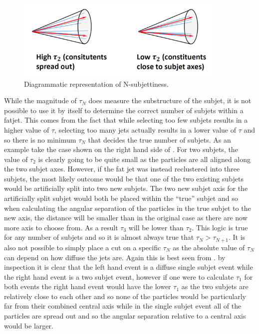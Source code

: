 \begin{figure}
  \centering
  \includegraphics[width=0.9\textwidth]{TopAnalysis/figures/nsubjettiness.png}
  \caption[Diagrammatic representation of N-subjettiness]{Diagrammatic representation of N-subjettiness.}
  \label{fig:nsubjet}
\end{figure}

While the magnitude of $\tau_N$ does measure the substructure of the subjet, it is not possible to use it by itself to determine the correct number of subjets within a fatjet. This comes from the fact that while selecting too few subjets results in a higher value of $\tau$, selecting too many jets actually results in a lower value of $\tau$ and so there is no minimum $\tau_N$ that decides the true number of subjets. As an example take the case shown on the right hand side of . For two subjets, the value of $\tau_2$ is clearly going to be quite small as the particles are all aligned along the two subjet axes. However, if the fat jet was instead reclustered into three subjets, the most likely outcome would be that one of the two existing subjets would be artificially split into two new subjets. The two new subjet axis for the artificially split subjet would both be placed within the ``true'' subjet and so when calculating the angular separation of the particles in the true subjet to the new axis, the distance will be smaller than in the original case as there are now more axis to choose from. As a result $\tau_3$ will be lower than $\tau_2$. This logic is true for any number of subjets and so it is almost always true that $\tau_N > \tau_{N+1}$. It is also not possible to simply place a cut on a specific $\tau_N$ as the absolute value of $\tau_N$ can depend on how diffuse the jets are. Again this is best seen from . by inspection it is clear that the left hand event is a diffuse single subjet event while the right hand event is a two subjet event, however if one were to calculate $\tau_1$ for both events the right hand event would have the lower $\tau_1$ as the two subjets are relatively close to each other and so none of the particles would be particularly far from their combined central axis while in the single subjet event all of the particles are spread out and so the angular separation relative to a central axis would be larger.

